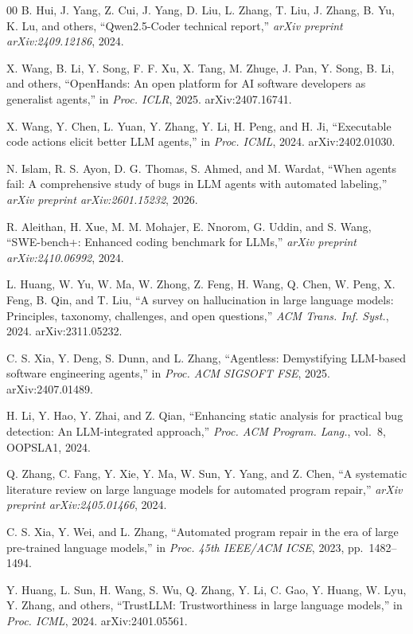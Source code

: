 \documentclass{ieeeaccess}
\begin{document}
\begin{thebibliography}{00}
 B. Hui, J. Yang, Z. Cui, J. Yang, D. Liu, L. Zhang, T. Liu, J. Zhang, B. Yu, K. Lu, and others, ``Qwen2.5-Coder technical report,'' \textit{arXiv preprint arXiv:2409.12186}, 2024.

 X. Wang, B. Li, Y. Song, F. F. Xu, X. Tang, M. Zhuge, J. Pan, Y. Song, B. Li, and others, ``OpenHands: An open platform for AI software developers as generalist agents,'' in \textit{Proc. ICLR}, 2025. arXiv:2407.16741.

 X. Wang, Y. Chen, L. Yuan, Y. Zhang, Y. Li, H. Peng, and H. Ji, ``Executable code actions elicit better LLM agents,'' in \textit{Proc. ICML}, 2024. arXiv:2402.01030.

 N. Islam, R. S. Ayon, D. G. Thomas, S. Ahmed, and M. Wardat, ``When agents fail: A comprehensive study of bugs in LLM agents with automated labeling,'' \textit{arXiv preprint arXiv:2601.15232}, 2026.

 R. Aleithan, H. Xue, M. M. Mohajer, E. Nnorom, G. Uddin, and S. Wang, ``SWE-bench+: Enhanced coding benchmark for LLMs,'' \textit{arXiv preprint arXiv:2410.06992}, 2024.

 L. Huang, W. Yu, W. Ma, W. Zhong, Z. Feng, H. Wang, Q. Chen, W. Peng, X. Feng, B. Qin, and T. Liu, ``A survey on hallucination in large language models: Principles, taxonomy, challenges, and open questions,'' \textit{ACM Trans. Inf. Syst.}, 2024. arXiv:2311.05232.

 C. S. Xia, Y. Deng, S. Dunn, and L. Zhang, ``Agentless: Demystifying LLM-based software engineering agents,'' in \textit{Proc. ACM SIGSOFT FSE}, 2025. arXiv:2407.01489.

 H. Li, Y. Hao, Y. Zhai, and Z. Qian, ``Enhancing static analysis for practical bug detection: An LLM-integrated approach,'' \textit{Proc. ACM Program. Lang.}, vol.~8, OOPSLA1, 2024.

 Q. Zhang, C. Fang, Y. Xie, Y. Ma, W. Sun, Y. Yang, and Z. Chen, ``A systematic literature review on large language models for automated program repair,'' \textit{arXiv preprint arXiv:2405.01466}, 2024.

 C. S. Xia, Y. Wei, and L. Zhang, ``Automated program repair in the era of large pre-trained language models,'' in \textit{Proc. 45th IEEE/ACM ICSE}, 2023, pp.~1482--1494.

 Y. Huang, L. Sun, H. Wang, S. Wu, Q. Zhang, Y. Li, C. Gao, Y. Huang, W. Lyu, Y. Zhang, and others, ``TrustLLM: Trustworthiness in large language models,'' in \textit{Proc. ICML}, 2024. arXiv:2401.05561.


\end{thebibliography}
\end{document}
